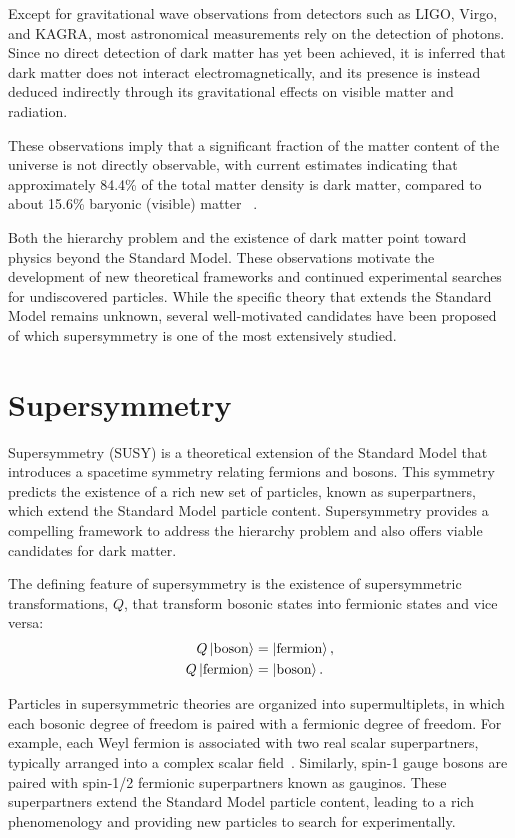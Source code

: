Except for gravitational wave observations from detectors such as LIGO, Virgo, and KAGRA, most astronomical measurements rely on the detection of photons. Since no direct detection of dark matter has yet been achieved, it is inferred that dark matter does not interact electromagnetically, and its presence is instead deduced indirectly through its gravitational effects on visible matter and radiation.

These observations imply that a significant fraction of the matter content of the universe is not directly observable, with current estimates indicating that approximately 84.4\% of the total matter density is dark matter, compared to about 15.6\% baryonic (visible) matter ~\cite{ParticleDataGroup:2024cfk}.

Both the hierarchy problem and the existence of dark matter point toward physics beyond the Standard Model. These observations motivate the development of new theoretical frameworks and continued experimental searches for undiscovered particles. While the specific theory that extends the Standard Model remains unknown, several well-motivated candidates have been proposed of which supersymmetry is one of the most extensively studied.

\section{Supersymmetry}
\label{sec:SUSY}

Supersymmetry (SUSY) is a theoretical extension of the Standard Model that introduces a spacetime symmetry relating fermions and bosons. This symmetry predicts the existence of a rich new set of particles, known as superpartners, which extend the Standard Model particle content. Supersymmetry provides a compelling framework to address the hierarchy problem and also offers viable candidates for dark matter.

The defining feature of supersymmetry is the existence of supersymmetric transformations, $Q$, that transform bosonic states into fermionic states and vice versa:
\begin{align}
    Q \Ket{\text{boson}} &= \Ket{\text{fermion}}, \\
    Q \Ket{\text{fermion}} &= \Ket{\text{boson}}.
\end{align}

Particles in supersymmetric theories are organized into supermultiplets, in which each bosonic degree of freedom is paired with a fermionic degree of freedom. For example, each Weyl fermion is associated with two real scalar superpartners, typically arranged into a complex scalar field~\cite{MARTIN_1998}. Similarly, spin-1 gauge bosons are paired with spin-1/2 fermionic superpartners known as gauginos. These superpartners extend the Standard Model particle content, leading to a rich phenomenology and providing new particles to search for experimentally. 



